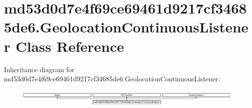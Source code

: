 \hypertarget{classmd53d0d7e4f69ce69461d9217cf34685de6_1_1GeolocationContinuousListener}{}\section{md53d0d7e4f69ce69461d9217cf34685de6.\+Geolocation\+Continuous\+Listener Class Reference}
\label{classmd53d0d7e4f69ce69461d9217cf34685de6_1_1GeolocationContinuousListener}
Inheritance diagram for md53d0d7e4f69ce69461d9217cf34685de6.\+Geolocation\+Continuous\+Listener\+:\begin{figure}[H]
\begin{center}
\leavevmode
\includegraphics[height=0.848485cm]{classmd53d0d7e4f69ce69461d9217cf34685de6_1_1GeolocationContinuousListener}
\end{center}
\end{figure}
